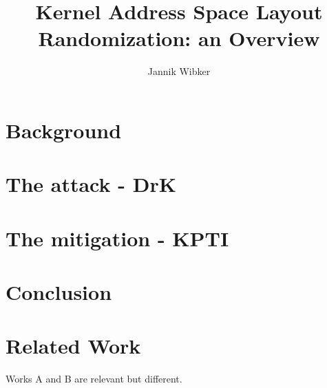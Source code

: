 \documentclass[10pt,twocolumn,a4paper]{article}
\author{Jannik Wibker}
\begin{document}
\title{ Kernel Address Space Layout Randomization: an Overview }

\newcommand{\todo}[1]{{\texttt{[#1]}}}
\newcommand{\code}[1]{{\tt \small{#1}}}

\maketitle

\begin{abstract}

\end{abstract}

\section{Background}\label{sec:background}



\section{The attack - DrK}\label{sec:drk}



\section{The mitigation - KPTI}\label{sec:kpti}



\section{Conclusion}\label{sec:conclusion}



\section{Related Work}\label{sec:relwork}

Works A and B are relevant but different.



\end{document}
